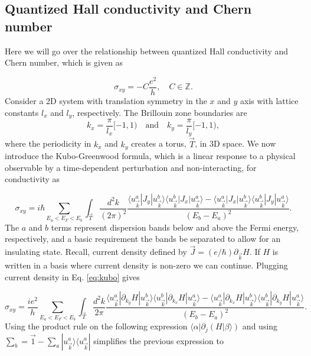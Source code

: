 \subsection{Quantized Hall conductivity and Chern number}

Here we will go over the relationship between quantized Hall conductivity and Chern number, which is given as

\begin{equation}
  \sigma_{xy} = - C\dfrac{e^2}{h}, \quad C \in \mathbb{Z}.
\end{equation}
Consider a 2D system with translation symmetry in the $x$ and $y$ axis with lattice constants $l_x$ and $l_y$, respectively.
The Brillouin zone boundaries are
\begin{equation}
  k_x = \dfrac{\pi}{l_x} [-1,1) \quad \text{and} \quad k_y = \dfrac{\pi}{l_y} [-1,1),
\end{equation}
where the periodicity in $k_x$ and $k_y$ creates a torus, $\vec{T}$, in 3D space.
We now introduce the Kubo-Greenwood formula, which is a linear response to a physical observable by a time-dependent perturbation and non-interacting, for conductivity as

\begin{equation} \label{eq:kubo}
  \sigma_{xy} = i\hbar \sum_{E_a < E_F < E_b} \int_{\vec{T}} \dfrac{d^2k}{(2\pi)^2} \dfrac{\langle u_{\vec{k}}^a | J_y | u_{\vec{k}}^b \rangle \langle u_{\vec{k}}^b | J_x | u_{\vec{k}}^a \rangle - \langle u_{\vec{k}}^a | J_x | u_{\vec{k}}^b \rangle \langle u_{\vec{k}}^b | J_y | u_{\vec{k}}^a \rangle}{{(E_b - E_a)}^2}.
\end{equation}
The $a$ and $b$ terms represent dispersion bands below and above the Fermi energy, respectively, and a basic requirement the bands be separated to allow for an insulating state.
Recall, current density defined by $\vec{J} = (e/\hbar) \partial_{\vec{k}} H$.
If $H$ is written in a basis where current density is non-zero we can continue.
Plugging current density in Eq. \eqref{eq:kubo} gives

\begin{equation}
  \sigma_{xy} = \dfrac{ie^2}{h} \sum_{E_a < E_F < E_b} \int_{\vec{T}} \dfrac{d^2k}{2\pi} \dfrac{\langle u_{\vec{k}}^a | \partial_{k_y} H | u_{\vec{k}}^b \rangle \langle u_{\vec{k}}^b | \partial_{k_x} H | u_{\vec{k}}^a \rangle - \langle u_{\vec{k}}^a | \partial_{k_x} H | u_{\vec{k}}^b \rangle \langle u_{\vec{k}}^b | \partial_{k_y} H | u_{\vec{k}}^a \rangle}{{(E_b - E_a)}^2}.
\end{equation}
Using the product rule on the following expression $\langle \alpha | \partial_j (H | \beta\rangle)$ and using $\sum_b = \vec{1} - \sum_a |u_{\vec{k}}^a\rangle \langle u_{\vec{k}}^a |$ simplifies the previous expression to


